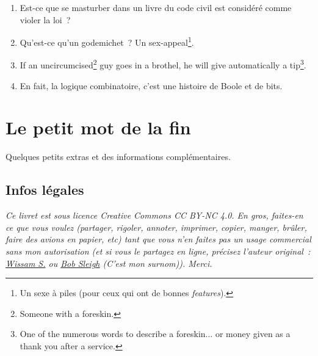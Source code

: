 \documentclass[10pt,a5paper,fullpage]{book}
\begin{document}
\begin{enumerate}
	\item Est-ce que se masturber dans un livre du code civil est considéré comme violer la loi~?
	\item Qu’est-ce qu’un godemichet~? Un sex-appeal\footnote{Un sexe à piles (pour ceux qui ont de bonnes \textit{features}).}. 
	\item If an uncircumcised\footnote{Someone with a foreskin.} guy goes in a brothel, he will give automatically a tip\footnote{One of the numerous words to describe a foreskin... or money given as a thank you after a service.}. 
	\item En fait, la logique combinatoire, c’est une histoire de Boole et de bits.
\end{enumerate}
	
	\chapter{Le petit mot de la fin}
	Quelques petits extras et des informations complémentaires. 
	\section{Infos légales}
	\textit{Ce livret est sous licence Creative Commons CC BY-NC 4.0. En gros, faites-en ce que vous voulez (partager, rigoler, annoter, imprimer, copier, manger, brûler, faire des avions en papier, etc) tant que vous n’en faites pas un usage commercial sans mon autorisation (et si vous le partagez en ligne, précisez l'auteur original~: \underline{Wissam S.} ou \underline{Bob Sleigh} (C'est mon surnom)). Merci.}  
	\newpage
\end{document}
